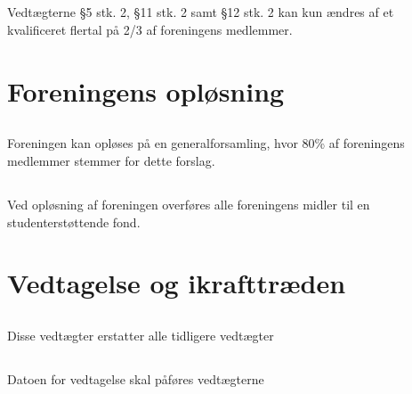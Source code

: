 \documentclass[danish,a4paper,twocolumn,oneside,article]{memoir}
\begin{document}
\section{} Vedtægterne \S 5 stk. 2, §11 stk. 2 samt \S 12 stk. 2 kan kun ændres af et kvalificeret flertal på 2/3 af
foreningens medlemmer.


\chapter{Foreningens opløsning}

\section{} Foreningen kan opløses på en generalforsamling, hvor 80\% af foreningens medlemmer stemmer
for dette forslag.

\section{} Ved opløsning af foreningen overføres alle foreningens midler til en studenterstøttende fond.

\chapter{Vedtagelse og ikrafttræden}

\section{} Disse vedtægter erstatter alle tidligere vedtægter

\section{} Datoen for vedtagelse skal påføres vedtægterne
\end{document}
